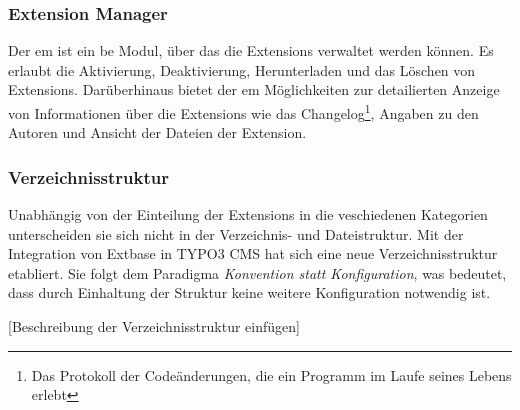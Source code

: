 \subsubsection{Extension Manager}
Der \gls{em} ist ein \gls{be} Modul, über das die Extensions verwaltet werden können. Es erlaubt die Aktivierung, Deaktivierung, Herunterladen und das Löschen von Extensions. Darüberhinaus bietet der \gls{em} Möglichkeiten zur detailierten Anzeige von Informationen über die Extensions wie das Changelog\footnote{Das Protokoll der Codeänderungen, die ein Programm im Laufe seines Lebens erlebt}, Angaben zu den Autoren und Ansicht der Dateien der Extension.

\subsubsection{Verzeichnisstruktur}
Unabhängig von der Einteilung der Extensions in die veschiedenen Kategorien unterscheiden sie sich nicht in der Verzeichnis- und Dateistruktur. Mit der Integration von Extbase in TYPO3 CMS hat sich eine neue Verzeichnisstruktur etabliert. Sie folgt dem Paradigma \textit{Konvention statt Konfiguration}, was bedeutet, dass durch Einhaltung der Struktur keine weitere Konfiguration notwendig ist.

[Beschreibung der Verzeichnisstruktur einfügen]

